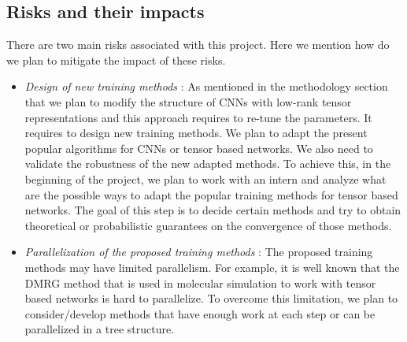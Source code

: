 \documentclass[11pt]{article}
\begin{document}
\subsection{Risks and their impacts}
There are two main risks associated with this project. Here we mention how do we plan to mitigate the impact of these risks.

\begin{itemize}
	\item \emph{Design of new training methods} : As mentioned in the methodology section that we plan to modify the structure of CNNs with low-rank tensor representations and this approach requires to re-tune the parameters. It requires to design new training methods. We plan to adapt the present popular algorithms for CNNs or tensor based networks. We also need to validate the robustness of the new adapted methods. To achieve this, in the beginning of the project, we plan to work with an intern and analyze what are the possible ways to adapt the popular training methods for tensor based networks. The goal of this step is to decide certain methods and try to obtain theoretical or probabilistic guarantees on the convergence of those methods.
	
	\item \emph{Parallelization of the proposed training methods} : The proposed training methods may have limited parallelism. For example, it is well known that the DMRG method that is used in molecular simulation to work with tensor based networks is hard to parallelize. To overcome this limitation, we plan to consider/develop methods that have enough work at each step or can be parallelized in a tree structure.
\end{itemize}
\end{document}
